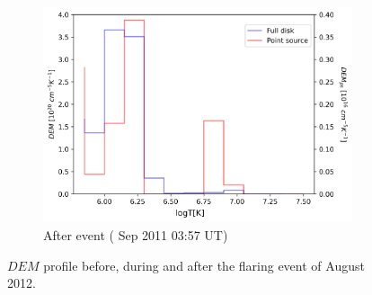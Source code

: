 \begin{figure}[h!]
\begin{subfigure}[b]{0.3\textwidth}
        \centering
        \includegraphics[width=\textwidth]{images/dem_profile_after_event_2012_aug_31.png}
        \caption{After event ( Sep 2011 03:57 UT)}
        \label{fig:dem_pro_aug_31_2012_c}
    \end{subfigure}

    \caption[DEM profile for  August 2012 Event]{$DEM$ profile before, during and after the flaring event of  August 2012.}
    \label{fig:dem_pro_aug_31_2012}
\end{figure}

